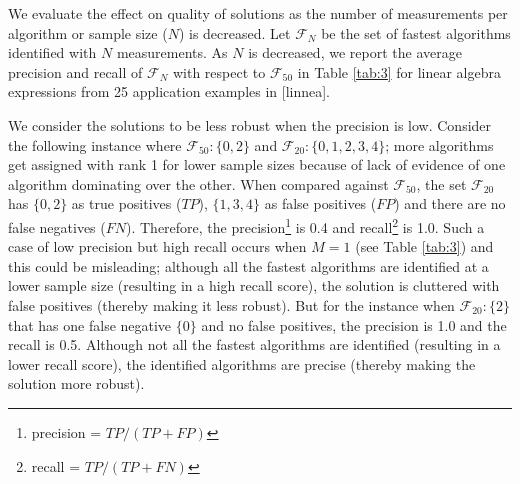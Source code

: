 \documentclass[conference]{IEEEtran}
\begin{document}
We evaluate the effect on quality of solutions as the number of measurements per algorithm or sample size ($N$) is decreased. Let $\mathcal{F}_{N}$ be the set of fastest algorithms identified with $N$ measurements. As $N$ is decreased, we report the average precision and recall of $\mathcal{F}_N $ with respect to $\mathcal{F}_{50}$ in Table \ref{tab:3} for linear algebra expressions from 25 application examples in [linnea].

We consider the solutions to be less robust when the precision is low. Consider the following instance where $\mathcal{F}_{50} : \{0,2\}$ and $\mathcal{F}_{20} : \{0,1,2,3,4\}$; more algorithms get assigned with rank 1 for lower sample sizes because of lack of evidence of one algorithm dominating over the other. When compared against $\mathcal{F}_{50}$, the set $\mathcal{F}_{20}$ has  $\{0,2\}$ as true positives ($TP$), $\{1,3,4\}$  as false positives ($FP$) and there are no false negatives ($FN$). Therefore, the precision\footnote{precision = $TP/(TP+FP)$} is 0.4 and recall\footnote{recall = $TP/(TP+FN)$} is 1.0. Such a case of low precision but high recall occurs when $M=1$ (see Table \ref{tab:3}) and this could be misleading; although all the fastest algorithms are identified at a lower sample size (resulting in a high recall score), the solution is cluttered with false positives (thereby making it less robust). But for the instance when $\mathcal{F}_{20} : \{2\}$ that has one false negative $\{0\}$ and no false positives, the precision is 1.0 and the recall is 0.5. Although not all the fastest algorithms are identified (resulting in a lower recall score), the identified algorithms are precise (thereby making the solution more robust).
\end{document}

